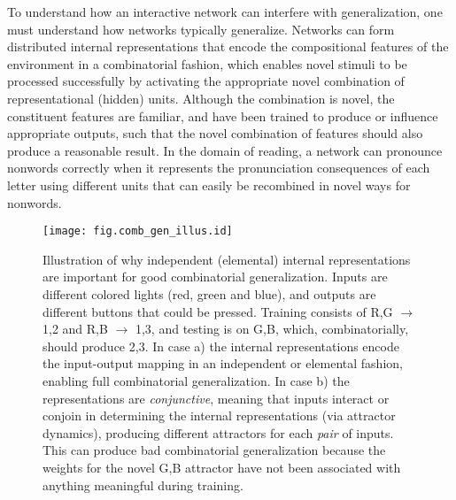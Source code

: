 \documentclass[12pt,twoside]{article}
\begin{document}
To understand how an interactive network can interfere with
generalization, one must understand how networks typically generalize.
Networks can form distributed internal representations that encode the
compositional features of the environment in a combinatorial fashion,
which enables novel stimuli to be processed successfully by activating
the appropriate novel combination of representational (hidden) units.
Although the combination is novel, the constituent features are
familiar, and have been trained to produce or influence appropriate
outputs, such that the novel combination of features should also
produce a reasonable result. In the domain of reading, a network can
pronounce nonwords correctly when it represents the pronunciation
consequences of each letter using different units that can easily be
recombined in novel ways for nonwords.

\begin{figure}
  \centering\texttt{[image: fig.comb\_gen\_illus.id]}
  \caption{\small Illustration of why independent (elemental) internal
    representations are important for good combinatorial
    generalization.  Inputs are different colored lights (red, green
    and blue), and outputs are different buttons that could be
    pressed.  Training consists of R,G $\rightarrow$ 1,2 and R,B
    $\rightarrow$ 1,3, and testing is on G,B, which, combinatorially,
    should produce 2,3. In case a) the internal representations encode
    the input-output mapping in an independent or elemental fashion,
    enabling full combinatorial generalization.  In case b) the
    representations are {\em conjunctive}, meaning that inputs
    interact or conjoin in determining the internal representations
    (via attractor dynamics), producing different attractors for each
    {\em pair} of inputs.  This can produce bad combinatorial
    generalization because the weights for the novel G,B attractor
    have not been associated with anything meaningful during
    training.}
  \label{fig.comb_gen_illus}
\end{figure}
\end{document}
